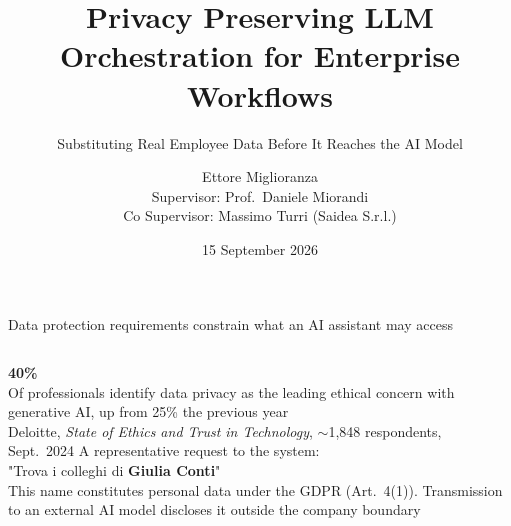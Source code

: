 \documentclass[aspectratio=169,11pt]{beamer}
\title{Privacy Preserving LLM Orchestration for Enterprise Workflows}
\subtitle{Substituting Real Employee Data Before It Reaches the AI Model}
\author{Ettore Miglioranza\\[1.5mm]{\small Supervisor: Prof.\ Daniele Miorandi\\[0.5mm]Co Supervisor: Massimo Turri \textmd{(Saidea S.r.l.)}}}
\institute{University of Trento}
\date{15 September 2026}
\begin{document}
\begin{frame}[plain]
  \titlepage
\end{frame}

\begin{frame}{Data protection requirements constrain what an AI assistant may access}
  \begin{columns}[c]
      {\Huge\bfseries\color{unitnred} 40\%}\\[1mm]
      {\small Of professionals identify data privacy as the leading ethical concern with generative AI, up from 25\% the previous year}\\[2.5mm]
      {\footnotesize\color{slidegray} Deloitte, \emph{State of Ethics and Trust in Technology}, $\sim$1{,}848 respondents, Sept.\ 2024}
      {\small A representative request to the system:}\\[2mm]
      {\small\ttfamily "Trova i colleghi di \textcolor{unitnred}{\bfseries Giulia Conti}"}\\[3mm]
      {\footnotesize\color{slidegray} This name constitutes personal data under the GDPR (Art.\ 4(1)). Transmission to an external AI model discloses it outside the company boundary}
  \end{columns}
\end{frame}
\end{document}
